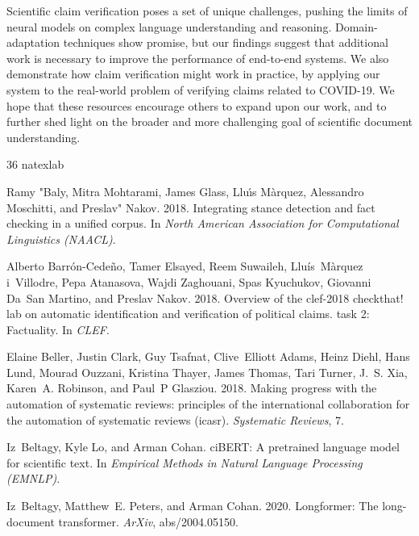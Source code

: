 \documentclass[11pt,a4paper]{article}
\begin{document}
Scientific claim verification poses a set of unique challenges, pushing the limits of neural models on complex language understanding and reasoning. Domain-adaptation techniques show promise, but our findings suggest that additional work is necessary to improve the performance of end-to-end systems. We also demonstrate how claim verification might work in practice, by applying our system to the real-world problem of verifying claims related to COVID-19. We hope that these resources encourage others to expand upon our work, and to further shed light on the broader and more challenging goal of scientific document understanding.
 


\begin{thebibliography}{36}
\expandafter\ifx\csname natexlab\endcsname\relax\def\natexlab#1{#1}\fi

Ramy "Baly, Mitra Mohtarami, James Glass, Llu{\'\i}s M{\`a}rquez, Alessandro
  Moschitti, and Preslav" Nakov. 2018.
\newblock Integrating stance detection and fact checking in a unified corpus.
\newblock In \emph{North American Association for Computational Linguistics
  (NAACL)}.

Alberto Barr{\'o}n-Cede{\~n}o, Tamer Elsayed, Reem Suwaileh,
  Llu{\'i}s~M{\`a}rquez i~Villodre, Pepa Atanasova, Wajdi Zaghouani, Spas
  Kyuchukov, Giovanni Da~San Martino, and Preslav Nakov. 2018.
\newblock Overview of the clef-2018 checkthat! lab on automatic identification
  and verification of political claims. task 2: Factuality.
\newblock In \emph{CLEF}.

Elaine Beller, Justin Clark, Guy Tsafnat, Clive~Elliott Adams, Heinz Diehl,
  Hans Lund, Mourad Ouzzani, Kristina Thayer, James Thomas, Tari Turner, J.~S.
  Xia, Karen~A. Robinson, and Paul~P Glasziou. 2018.
\newblock Making progress with the automation of systematic reviews: principles
  of the international collaboration for the automation of systematic reviews
  (icasr).
\newblock \emph{Systematic Reviews}, 7.

Iz~Beltagy, Kyle Lo, and Arman Cohan.
ci{BERT}: A pretrained language model for scientific text.
\newblock In \emph{Empirical Methods in Natural Language Processing (EMNLP)}.

Iz~Beltagy, Matthew~E. Peters, and Arman Cohan. 2020.
\newblock Longformer: The long-document transformer.
\newblock \emph{ArXiv}, abs/2004.05150.


\end{thebibliography}
\end{document}
